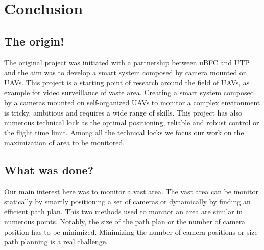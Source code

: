 \chapter{Conclusion}\label{chap:Conclu}

\minitoc



\section{The origin! }
The original project was initiated with a partnership between uBFC and UTP and the aim was to develop a smart system composed by camera mounted on UAVs. This project is a starting point of research around the field of UAVs, as example for video surveillance of vaste area. Creating a smart system composed by a cameras mounted on self-organized UAVs to monitor a complex environment is tricky, ambitious and requires a wide range of skills. This project has also numerous technical lock as the optimal positioning, reliable and robust control or the flight time limit. Among all the technical locks we focus our work on the maximization of area to be monitored. 

\section{What was done?}
Our main interest here was to monitor a vast area. 
The vast area can be monitor statically by smartly positioning a set of cameras or dynamically by finding an efficient path plan. This two methods used to monitor an area are similar in numerous points. 
Notably, the size of the path plan or the number of camera position has to be minimized. Minimizing the number of camera positions or size path planning is a real challenge. 


